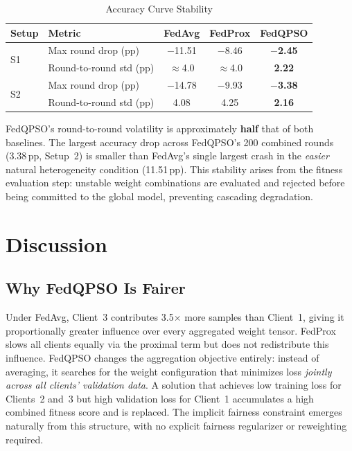 \documentclass[conference]{IEEEtran}
\begin{document}
\begin{table}[htbp]
\caption{Accuracy Curve Stability}
\label{tab:stability}
\begin{center}
\begin{tabular}{llccc}
\hline
\textbf{Setup} & \textbf{Metric} & \textbf{FedAvg} & \textbf{FedProx} &
\textbf{FedQPSO}\\
\hline
\multirow{2}{*}{S1} & Max round drop (pp) & $-$11.51 & $-$8.46 &
\textbf{$-$2.45}\\
 & Round-to-round std (pp) & $\approx$4.0 & $\approx$4.0 & \textbf{2.22}\\
\hline
\multirow{2}{*}{S2} & Max round drop (pp) & $-$14.78 & $-$9.93 &
\textbf{$-$3.38}\\
 & Round-to-round std (pp) & 4.08 & 4.25 & \textbf{2.16}\\
\hline
\end{tabular}
\end{center}
\end{table}

FedQPSO's round-to-round volatility is approximately \textbf{half} that
of both baselines. The largest accuracy drop across FedQPSO's 200 combined
rounds (3.38\,pp, Setup~2) is smaller than FedAvg's single largest crash in
the \emph{easier} natural heterogeneity condition (11.51\,pp). This
stability arises from the fitness evaluation step: unstable weight
combinations are evaluated and rejected before being committed to the global
model, preventing cascading degradation.

\section{Discussion}
\label{sec:discussion}

\subsection{Why FedQPSO Is Fairer}
Under FedAvg, Client~3 contributes 3.5$\times$ more samples than Client~1,
giving it proportionally greater influence over every aggregated weight
tensor. FedProx slows all clients equally via the proximal term but does not
redistribute this influence. FedQPSO changes the aggregation objective
entirely: instead of averaging, it searches for the weight configuration
that minimizes loss \emph{jointly across all clients' validation data}. A
solution that achieves low training loss for Clients~2 and~3 but high
validation loss for Client~1 accumulates a high combined fitness score and is
replaced. The implicit fairness constraint emerges naturally from this
structure, with no explicit fairness regularizer or reweighting required.
\end{document}
